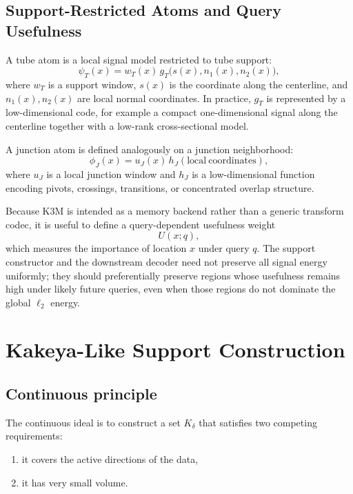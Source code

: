 \documentclass[11pt]{article}
\begin{document}
\subsection{Support-Restricted Atoms and Query Usefulness}
A tube atom is a local signal model restricted to tube support:
\begin{equation}
\psi_T(x)=w_T(x)\,g_T\bigl(s(x),n_1(x),n_2(x)\bigr),
\end{equation}
where $w_T$ is a support window, $s(x)$ is the coordinate along the centerline, and $n_1(x),n_2(x)$ are local normal coordinates. In practice, $g_T$ is represented by a low-dimensional code, for example a compact one-dimensional signal along the centerline together with a low-rank cross-sectional model.

A junction atom is defined analogously on a junction neighborhood:
\begin{equation}
\phi_J(x)=u_J(x)\,h_J(\mathrm{local\ coordinates}),
\end{equation}
where $u_J$ is a local junction window and $h_J$ is a low-dimensional function encoding pivots, crossings, transitions, or concentrated overlap structure.

Because K3M is intended as a memory backend rather than a generic transform codec, it is useful to define a query-dependent usefulness weight
\begin{equation}
U(x;q),
\end{equation}
which measures the importance of location $x$ under query $q$. The support constructor and the downstream decoder need not preserve all signal energy uniformly; they should preferentially preserve regions whose usefulness remains high under likely future queries, even when those regions do not dominate the global $\ell_2$ energy.

\section{Kakeya-Like Support Construction}
\subsection{Continuous principle}
The continuous ideal is to construct a set $K_\delta$ that satisfies two competing requirements:
\begin{enumerate}[leftmargin=1.5em]
\item it covers the active directions of the data,
\item it has very small volume.
\end{enumerate}
\end{document}
